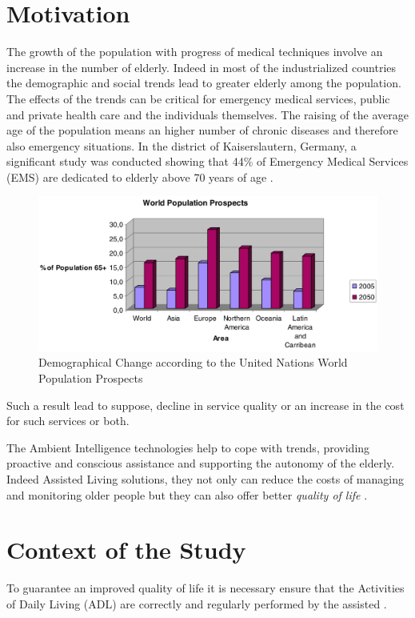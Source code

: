 \documentclass{thesisreport}
\begin{document}
\section{Motivation}
  The growth of the population with progress of medical techniques involve an increase in the number of elderly. Indeed in most of the industrialized countries the demographic and social trends lead to greater elderly among the population. The effects of the trends can be critical for emergency medical services, public and private health care and the individuals themselves. 
 The raising of the average age of the population means an higher number of chronic diseases and therefore also emergency situations. 
 In the district of Kaiserslautern, Germany, a significant study was conducted showing that 44\% of Emergency Medical Services (EMS) are dedicated to elderly above 70 years of age \cite{kleinberger2007ambient}.
 	\begin{figure}[H]
		\centering
		\includegraphics[width=12cm]{Thesis/data/populationProspect.png}
		\caption{\small{Demographical Change according to the United Nations World Population Prospects \cite{kleinberger2007ambient}}}
		\label{fig:populationProspect}
	\end{figure}
 Such a result lead to suppose, decline in service quality or an increase in the cost for such services or both. 
 
 \parskip  \parskip
 
 The Ambient Intelligence technologies help to cope with trends, providing proactive and conscious assistance and supporting the autonomy of the elderly. Indeed Assisted Living solutions, they not only can reduce the costs of managing and monitoring older people but they can also offer better \textit{quality of life} \cite{kleinberger2007ambient}.
 
 
 \section{Context of the Study}
  To guarantee an improved quality of life it is necessary ensure that the Activities of Daily Living (ADL) are correctly and regularly performed by the assisted \cite{buoncompagni2017towards}.
 
\end{document}
